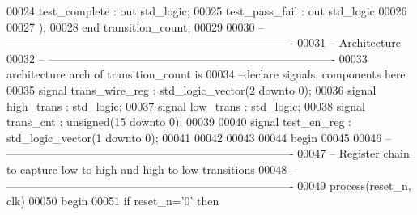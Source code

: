 \begin{DoxyCode}
00024             \textcolor{vhdlchar}{test_complete}   \textcolor{vhdlchar}{:} \textcolor{keywordflow}{out} \textcolor{comment}{std\_logic};
00025             \textcolor{vhdlchar}{test_pass_fail}  \textcolor{vhdlchar}{:} \textcolor{keywordflow}{out} \textcolor{comment}{std\_logic}
00026      
00027         \textcolor{vhdlchar}{)};
00028 \textcolor{keywordflow}{end} \textcolor{vhdlchar}{transition\_count};
00029 
00030 \textcolor{keyword}{-- ----------------------------------------------------------------------------}
00031 \textcolor{keyword}{-- Architecture}
00032 \textcolor{keyword}{-- ----------------------------------------------------------------------------}
00033 \textcolor{keywordflow}{architecture} arch \textcolor{keywordflow}{of} transition_count is
00034 \textcolor{keyword}{--declare signals,  components here}
00035 \textcolor{keywordflow}{signal} \textcolor{vhdlchar}{trans_wire_reg} \textcolor{vhdlchar}{:} \textcolor{comment}{std\_logic\_vector}\textcolor{vhdlchar}{(}\textcolor{vhdllogic}{}\textcolor{vhdllogic}{2} \textcolor{keywordflow}{downto} \textcolor{vhdllogic}{}\textcolor{vhdllogic}{0}\textcolor{vhdlchar}{)};
00036 \textcolor{keywordflow}{signal} \textcolor{vhdlchar}{high_trans}       \textcolor{vhdlchar}{:} \textcolor{comment}{std\_logic};
00037 \textcolor{keywordflow}{signal} \textcolor{vhdlchar}{low_trans}        \textcolor{vhdlchar}{:} \textcolor{comment}{std\_logic};
00038 \textcolor{keywordflow}{signal} \textcolor{vhdlchar}{trans_cnt}        \textcolor{vhdlchar}{:} \textcolor{comment}{unsigned}\textcolor{vhdlchar}{(}\textcolor{vhdllogic}{}\textcolor{vhdllogic}{15} \textcolor{keywordflow}{downto} \textcolor{vhdllogic}{}\textcolor{vhdllogic}{0}\textcolor{vhdlchar}{)};
00039 
00040 \textcolor{keywordflow}{signal} \textcolor{vhdlchar}{test_en_reg}  \textcolor{vhdlchar}{:} \textcolor{comment}{std\_logic\_vector}\textcolor{vhdlchar}{(}\textcolor{vhdllogic}{}\textcolor{vhdllogic}{1} \textcolor{keywordflow}{downto} \textcolor{vhdllogic}{}\textcolor{vhdllogic}{0}\textcolor{vhdlchar}{)};
00041 
00042 
00043   
00044 \textcolor{vhdlkeyword}{begin}
00045 
00046 \textcolor{keyword}{-- ----------------------------------------------------------------------------}
00047 \textcolor{keyword}{-- Register chain to capture low to high and high to low transitions}
00048 \textcolor{keyword}{-- ----------------------------------------------------------------------------}
00049 \textcolor{keywordflow}{process}(reset_n, clk)
00050 \textcolor{vhdlkeyword}{begin }
00051     \textcolor{keywordflow}{if} \textcolor{vhdlchar}{reset_n}\textcolor{vhdlchar}{=}\textcolor{vhdlchar}{'}\textcolor{vhdllogic}{}\textcolor{vhdllogic}{0}\textcolor{vhdlchar}{'} \textcolor{keywordflow}{then}

\end{DoxyCode}
